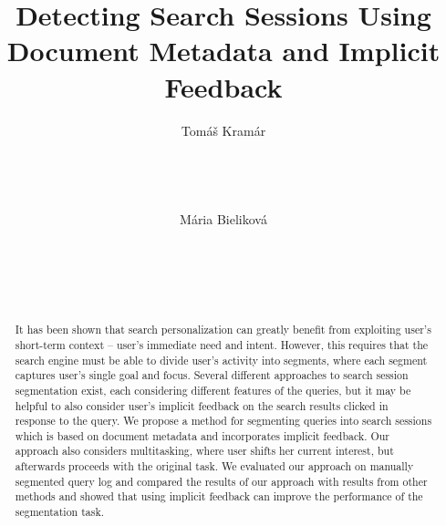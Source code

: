 \documentclass{acm_proc_article-sp} %
\begin{document}
\title{Detecting Search Sessions Using Document Metadata and
	Implicit Feedback}


\author{
\alignauthor
Tomáš Kramár\\
       \\
       \\
       \\
       \\
\alignauthor
Mária Bieliková\\
       \\
       \\
       \\
       \\
}

\maketitle

\begin{abstract}
It has been shown that search personalization can greatly
benefit from exploiting user’s short-term context – user’s
immediate need and intent. However, this requires that the
search engine must be able to divide user’s activity into segments,
where each segment captures user’s single goal and
focus. Several different approaches to search session segmentation
exist, each considering different features of the
queries, but it may be helpful to also consider user’s implicit
feedback on the search results clicked in response to
the query. We propose a method for segmenting queries into
search sessions which is based on document metadata and
incorporates implicit feedback. Our approach also considers
multitasking, where user shifts her current interest, but afterwards
proceeds with the original task. We evaluated our
approach on manually segmented query log and compared
the results of our approach with results from other methods
and showed that using implicit feedback can improve the
performance of the segmentation task.

\end{abstract}
\end{document}
